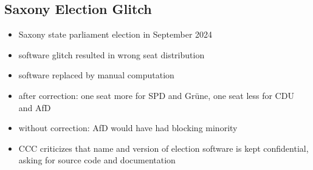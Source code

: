 \subsection{Saxony Election Glitch} %
\begin{frame}{\insertsubsection}
	\begin{fancycolumns}
		\begin{definition}{\insertsubsection{}}
			\begin{itemize}
				\item Saxony state parliament election in September 2024
				\item software glitch resulted in wrong seat distribution
				\item software replaced by manual computation
				\item after correction: one seat more for SPD and Grüne, one seat less for CDU and AfD
				\item without correction: AfD would have had blocking minority 
				\item CCC criticizes that name and version of election software is kept confidential, asking for source code and documentation
			\end{itemize}
		\end{definition}
		\nextcolumn
		\centering{}
	\end{fancycolumns}
\end{frame}

